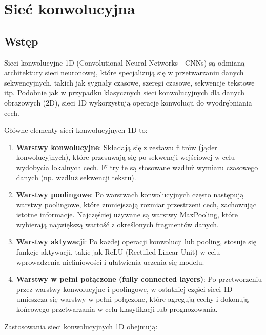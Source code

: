 \documentclass{article}
\begin{document}
\section{Sieć konwolucyjna}

\subsection{Wstęp}

Sieci konwolucyjne 1D (Convolutional Neural Networks - CNNs) są odmianą architektury sieci neuronowej, które specjalizują się w przetwarzaniu danych sekwencyjnych, takich jak sygnały czasowe, szeregi czasowe, sekwencje tekstowe itp. Podobnie jak w przypadku klasycznych sieci konwolucyjnych dla danych obrazowych (2D), sieci 1D wykorzystują operacje konwolucji do wyodrębniania cech.

Główne elementy sieci konwolucyjnych 1D to:

\begin{enumerate}

\item \textbf{Warstwy konwolucyjne}: Składają się z zestawu filtrów (jąder konwolucyjnych), które przesuwają się po sekwencji wejściowej w celu wydobycia lokalnych cech. Filtry te są stosowane wzdłuż wymiaru czasowego danych (np. wzdłuż sekwencji tekstu).

\item \textbf{Warstwy poolingowe}: Po warstwach konwolucyjnych często następują warstwy poolingowe, które zmniejszają rozmiar przestrzeni cech, zachowując istotne informacje. Najczęściej używane są warstwy MaxPooling, które wybierają największą wartość z określonych fragmentów danych.

\item \textbf{Warstwy aktywacji}: Po każdej operacji konwolucji lub pooling, stosuje się funkcje aktywacji, takie jak ReLU (Rectified Linear Unit) w celu wprowadzenia nieliniowości i ułatwienia uczenia się modelu.

\item \textbf{Warstwy w pełni połączone (fully connected layers)}: Po przetworzeniu przez warstwy konwolucyjne i poolingowe, w ostatniej części sieci 1D umieszcza się warstwy w pełni połączone, które agregują cechy i dokonują końcowego przetwarzania w celu klasyfikacji lub prognozowania.

\end{enumerate}
Zastosowania sieci konwolucyjnych 1D obejmują:
\end{document}
